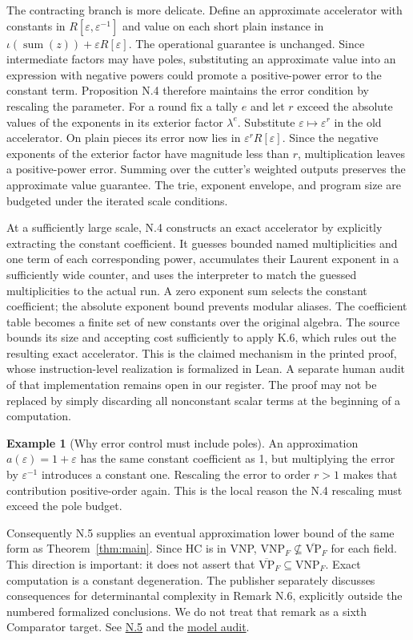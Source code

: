 \documentclass[11pt,letterpaper]{article}
\theoremstyle{definition}\newtheorem{definition}[theorem]{Definition}\newtheorem{example}[theorem]{Example}
\theoremstyle{remark}\newtheorem{remark}[theorem]{Remark}
\newcommand{\VNP}{\mathrm{VNP}}
\newcommand{\bVP}{\overline{\mathrm{VP}}}
\newcommand{\pub}[3]{\href{https://github.com/anthropics/formal-math/blob/11b6c7e3c927df2658f513b6b68ea7f8929c62c5/vp-vnp/#1\#L#2}{#3}}
\newcommand{\aud}[2]{\href{https://github.com/nousentllc/VP-VNP-Review/blob/567303d0bcf4f9d54390437b137752446e58ccd6/#1}{#2}}
\begin{document}
The contracting branch is more delicate. Define an approximate accelerator with constants in $R[\varepsilon,\varepsilon^{-1}]$ and value on each short plain instance in $\iota(\operatorname{sum}(z))+\varepsilon R[\varepsilon]$. The operational guarantee is unchanged. Since intermediate factors may have poles, substituting an approximate value into an expression with negative powers could promote a positive-power error to the constant term. Proposition N.4 therefore maintains the error condition by rescaling the parameter. For a round fix a tally $e$ and let $r$ exceed the absolute values of the exponents in its exterior factor $\lambda^e$. Substitute $\varepsilon\mapsto\varepsilon^r$ in the old accelerator. On plain pieces its error now lies in $\varepsilon^rR[\varepsilon]$. Since the negative exponents of the exterior factor have magnitude less than $r$, multiplication leaves a positive-power error. Summing over the cutter's weighted outputs preserves the approximate value guarantee. The trie, exponent envelope, and program size are budgeted under the iterated scale conditions.

At a sufficiently large scale, N.4 constructs an exact accelerator by explicitly extracting the constant coefficient. It guesses bounded named multiplicities and one term of each corresponding power, accumulates their Laurent exponent in a sufficiently wide counter, and uses the interpreter to match the guessed multiplicities to the actual run. A zero exponent sum selects the constant coefficient; the absolute exponent bound prevents modular aliases. The coefficient table becomes a finite set of new constants over the original algebra. The source bounds its size and accepting cost sufficiently to apply K.6, which rules out the resulting exact accelerator. This is the claimed mechanism in the printed proof, whose instruction-level realization is formalized in Lean. A separate human audit of that implementation remains open in our register. The proof may not be replaced by simply discarding all nonconstant scalar terms at the beginning of a computation.

\begin{example}[Why error control must include poles]
An approximation $a(\varepsilon)=1+\varepsilon$ has the same constant coefficient as 1, but multiplying the error by $\varepsilon^{-1}$ introduces a constant one. Rescaling the error to order $r>1$ makes that contribution positive-order again. This is the local reason the N.4 rescaling must exceed the pole budget.
\end{example}
Consequently N.5 supplies an eventual approximation lower bound of the same form as Theorem~\ref{thm:main}. Since HC is in VNP, $\VNP_F\not\subseteq\bVP_F$ for each field. This direction is important: it does not assert that $\bVP_F\subseteq\VNP_F$. Exact computation is a constant degeneration. The publisher separately discusses consequences for determinantal complexity in Remark N.6, explicitly outside the numbered formalized conclusions. We do not treat that remark as a sixth Comparator target. See \pub{Paper/Approximate.lean}{266}{N.5} and the \aud{passes/statement-correspondence.md}{model audit}.
\end{document}
